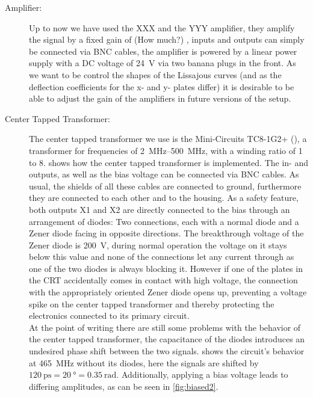 \begin{description}
	\item[Amplifier:] Up to now we have used the XXX  and the YYY  amplifier, they amplify the signal by a fixed gain of (How much?) , inputs and outputs can  simply be connected via BNC cables, the amplifier is powered by a linear power supply with a DC voltage of \SI{24}{\volt} via two banana plugs in the front. As we want to be control the shapes of the Lissajous curves (and as the deflection coefficients for the x- and y- plates differ) it is desirable to be able to adjust the gain of the amplifiers in future versions of the setup. 
	\item[Center Tapped Transformer:] The center tapped transformer we use is the Mini-Circuits TC8-1G2+ (\cite{TC8-1G2}), a transformer for frequencies of \SIrange{2}{500}{\mega\hertz}, with a winding ratio of 1 to 8.  shows how the center tapped transformer is implemented. The in- and outputs, as well as the bias voltage can be connected via BNC cables. As usual, the shields of all these cables are connected to ground, furthermore they are connected to each other and to the housing. As a safety feature, both outputs X1 and X2 are directly connected to the bias through an arrangement of diodes: Two connections, each with a normal diode and a Zener diode facing in opposite directions. The breakthrough voltage of the Zener diode is \SI{200}{\volt}, during normal operation the voltage on it stays below this value and none of the connections let any current through as one of the two diodes is always blocking it. However if one of the plates in the CRT accidentally comes in contact with high voltage, the connection with the appropriately oriented Zener diode opens up, preventing a voltage spike on the center tapped transformer and thereby protecting the electronics connected to its primary circuit.\\
	At the point of writing there are still some problems with the behavior of the center tapped transformer, the capacitance of the diodes introduces an undesired phase shift between the two signals.  shows the circuit's behavior at \SI{465}{\mega\hertz} without its diodes, here the signals are shifted by $\SI{120}{\pico\second} = \SI{20}{\degree} = \SI{0.35}{\radian}$. Additionally, applying a bias voltage leads to differing amplitudes, as can be seen in \cref{fig:biased2}.  

\end{description}
